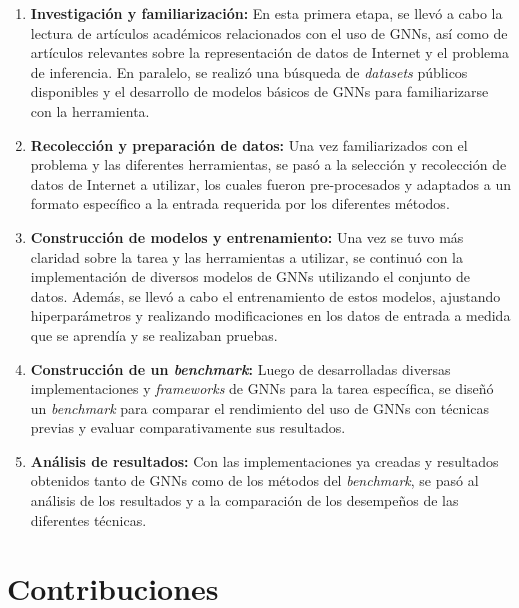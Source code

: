 \begin{enumerate}

    \item \textbf{Investigación y familiarización:} En esta primera etapa, se llevó a cabo la lectura de artículos académicos relacionados con el uso de GNNs, así como de artículos relevantes sobre la representación de datos de Internet y el problema de inferencia. En paralelo, se realizó una búsqueda de \textit{datasets} públicos disponibles y el desarrollo de modelos básicos de GNNs para familiarizarse con la herramienta.
    
    \item \textbf{Recolección y preparación de datos:} Una vez familiarizados con el problema y las diferentes herramientas, se pasó a la selección y recolección de datos de Internet a utilizar, los cuales fueron pre-procesados y adaptados a un formato específico a la entrada requerida por los diferentes métodos.
    
    \item \textbf{Construcción de modelos y entrenamiento:} Una vez se tuvo más claridad sobre la tarea y las herramientas a utilizar, se continuó con la implementación de diversos modelos de GNNs utilizando el conjunto de datos. Además, se llevó a cabo el entrenamiento de estos modelos, ajustando hiperparámetros y realizando modificaciones en los datos de entrada a medida que se aprendía y se realizaban pruebas.
    
    \item \textbf{Construcción de un \textit{benchmark}:} Luego de desarrolladas diversas implementaciones y \textit{frameworks} de GNNs para la tarea específica, se diseñó un \textit{benchmark} para comparar el rendimiento del uso de GNNs con técnicas previas y evaluar comparativamente sus resultados.
    
    \item \textbf{Análisis de resultados:} Con las implementaciones ya creadas y resultados obtenidos tanto de GNNs como de los métodos del \textit{benchmark}, se pasó al análisis de los resultados y a la comparación de los desempeños de las diferentes técnicas.

\end{enumerate}


\section{Contribuciones}


